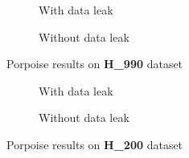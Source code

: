        \begin{figure}[H]
            \centering
            \begin{subfigure}{0.47\textwidth}
              \centering
              \resizebox{\textwidth}{!}{}
              \captionsetup{justification=centering}
              \caption{With data leak}
            \end{subfigure}%
            \hspace{0.05\textwidth}
            \begin{subfigure}{0.47\textwidth}
              \centering
              \resizebox{\textwidth}{!}{}
              \captionsetup{justification=centering}
              \caption{Without data leak}
            \end{subfigure}
            \caption{Porpoise results on \textbf{H\_990} dataset}\label{fig:porpoise_h990}
        \end{figure}

        \begin{figure}[H]
            \centering
            \begin{subfigure}{0.45\textwidth}
              \centering
              \resizebox{\textwidth}{!}{}
              \captionsetup{justification=centering}
              \caption{With data leak}
            \end{subfigure}%
            \hspace{0.05\textwidth}
            \begin{subfigure}{0.45\textwidth}
              \centering
              \resizebox{\textwidth}{!}{}
              \captionsetup{justification=centering}
              \caption{Without data leak}
            \end{subfigure}
            \caption{Porpoise results on \textbf{H\_200} dataset}\label{fig:porpoise_h200}
        \end{figure}


